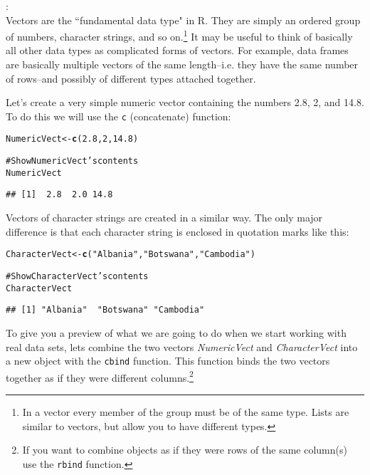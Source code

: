 \documentclass[ChapterTOCs,krantz1]{krantz}\usepackage{graphicx, color}
\makeatletter
\newcommand{\hlfunctioncall}[1]{\textcolor[rgb]{0.501960784313725,0,0.329411764705882}{\textbf{#1}}}%
\newcommand{\hlstring}[1]{\textcolor[rgb]{0.6,0.6,1}{#1}}%
\newcommand{\hlcomment}[1]{\textcolor[rgb]{0.180392156862745,0.6,0.341176470588235}{#1}}%
\newenvironment{kframe}{%
 \def\at@end@of@kframe{}%
 \ifinner\ifhmode%
  \def\at@end@of@kframe{\end{minipage}}%
  \begin{minipage}{\columnwidth}%
 \fi\fi%
 \def\FrameCommand##1{\hskip\@totalleftmargin \hskip-\fboxsep
 \colorbox{shadecolor}{##1}\hskip-\fboxsep
     \hskip-\linewidth \hskip-\@totalleftmargin \hskip\columnwidth}%
 \MakeFramed {\advance\hsize-\width
   \@totalleftmargin\z@ \linewidth\hsize
   \@setminipage}}%
 {\par\unskip\endMakeFramed%
 \at@end@of@kframe}
\newenvironment{knitrout}{}{} %
\makeatother
\begin{document}
: \\[0.25cm] Vectors are the ``fundamental data type"\cite{Matloff2011} in R. They are simply an ordered group of numbers, character strings, and so on.\footnote{In a vector every member of the group must be of the same type. Lists are similar to vectors, but allow you to have different types.} It may be useful to think of basically all other data types as complicated forms of vectors. For example, data frames are basically multiple vectors of the same length--i.e. they have the same number of rows--and possibly of different types attached together. 

Let's create a very simple numeric vector containing the numbers 2.8, 2, and 14.8. To do this we will use the \texttt{c} (concatenate) function:

\begin{knitrout}
\color{fgcolor}\begin{kframe}
\begin{alltt}
NumericVect <- \hlfunctioncall{c}(2.8, 2, 14.8)

\hlcomment{# Show NumericVect's contents}
NumericVect
\end{alltt}
\begin{verbatim}
## [1]  2.8  2.0 14.8
\end{verbatim}
\end{kframe}
\end{knitrout}


Vectors of character strings are created in a similar way. The only major difference is that each character string is enclosed in quotation marks like this:

\begin{knitrout}
\color{fgcolor}\begin{kframe}
\begin{alltt}
CharacterVect <- \hlfunctioncall{c}(\hlstring{"Albania"}, \hlstring{"Botswana"}, \hlstring{"Cambodia"})

\hlcomment{# Show CharacterVect's contents}
CharacterVect
\end{alltt}
\begin{verbatim}
## [1] "Albania"  "Botswana" "Cambodia"
\end{verbatim}
\end{kframe}
\end{knitrout}


To give you a preview of what we are going to do when we start working with real data sets, lets combine the two vectors {\emph{NumericVect}} and {\emph{CharacterVect}} into a new object with the \texttt{cbind} function. This function binds the two vectors together as if they were different columns.\footnote{If you want to combine objects as if they were rows of the same column(s) use the \texttt{rbind} function.}
\end{document}
